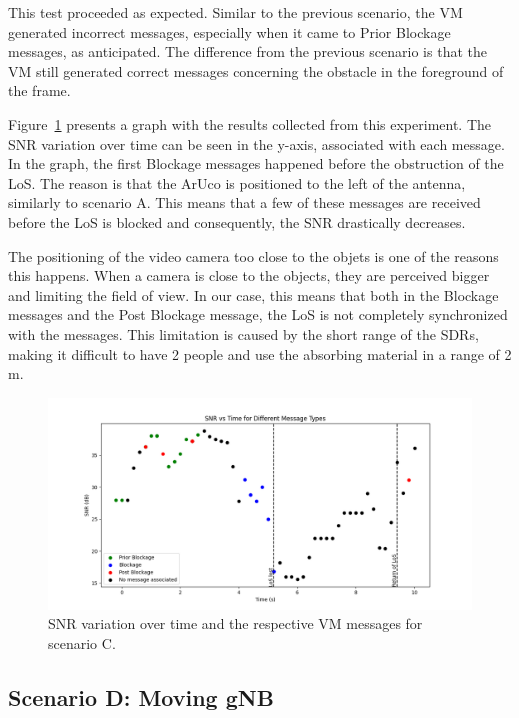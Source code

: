 This test proceeded as expected.
Similar to the previous scenario, the VM generated incorrect messages, especially when it came to Prior Blockage messages, as anticipated.
The difference from the previous scenario is that the VM still generated correct messages concerning the obstacle in the foreground of the frame.

Figure~\ref{fig:results_2} presents a graph with the results collected from this experiment.
The SNR variation over time can be seen in the y-axis, associated with each message.
In the graph, the first Blockage messages happened before the obstruction of the LoS\@.
The reason is that the ArUco is positioned to the left of the antenna, similarly to scenario A\@.
This means that a few of these messages are received before the LoS is blocked and consequently, the SNR drastically decreases.

The positioning of the video camera too close to the objets is one of the reasons this happens.
When a camera is close to the objects, they are perceived bigger and limiting the field of view.
In our case, this means that both in the Blockage messages and the Post Blockage message, the LoS is not completely synchronized with the messages.
This limitation is caused by the short range of the SDRs, making it difficult to have 2 people and use the absorbing material in a range of 2 m.


\begin{figure}[H]
    \centering
    \includegraphics[width=\linewidth]{figures/results_2}
    \caption{SNR variation over time and the respective VM messages for scenario C.}
    \label{fig:results_2}
\end{figure}

\subsection{Scenario D: Moving gNB}\label{subsec:scenario-3:-moving-gnb}

